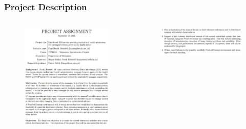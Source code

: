 \documentclass[hyperref={pdfpagelabels=false}, aspectratio=1610]{beamer}
\begin{document}
\begin{frame}
\frametitle{Project Description}
\begin{block}{}
\begin{columns}

\begin{column}{.5\textwidth}
\begin{figure}[htbp]
\centering
\includegraphics[scale=0.2]{fig/pdesc1}
\end{figure}
\end{column}

\begin{column}{.5\textwidth}
\begin{figure}[htbp]
\centering
\includegraphics[scale=0.25]{fig/pdesc2}
\end{figure}
\end{column}

\end{columns}
\end{block}
\end{frame}
\end{document}
